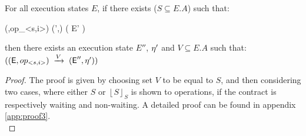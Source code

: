 %
%

\begin{theorem}
\label{theorem:three}
For all execution states $E$, if there
exists ($S\subseteq E.A$) such that: 
\begin{smathpar}
 {(\E,op_{<s,i>})} {} {(\E',\eff)} \spc \wedge \spc ( \psi {} E' )  
\end{smathpar}
then there exists an execution state $E''$, $\eta'$ and $V\subseteq E.A$ such that:
$(({\normalfont \textsf{E}},op_{<s,i>})\;\xrightarrow{V}\;({\normalfont \textsf{E}}'',\eta'))$
\end{theorem}
\begin{proof}
The proof is given by choosing set $V$ to be equal to $S$, and then
considering two cases, where either $S$ or $\left \lfloor S \right
\rfloor_S$ is shown to operations, if the contract is respectively
waiting and non-waiting.
A detailed proof can be found in appendix
\ref{app:proof3}.
\\
\end{proof}

